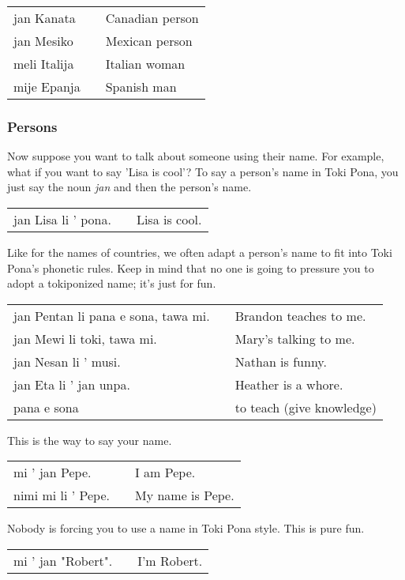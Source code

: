 \begin{supertabular}{p{5,5cm}|ll}
jan Kanata && Canadian person \\
jan Mesiko && Mexican person \\
meli Italija && Italian woman \\
mije Epanja && Spanish man \\
\end{supertabular} 

%
\subsubsection*{Persons}
%
Now suppose you want to talk about someone using their name. 
For example, what if you want to say 'Lisa is cool'? 
To say a person's name in Toki Pona, you just say the noun \textit{jan} and then the person's name. 

\begin{supertabular}{p{5,5cm}|ll}
jan Lisa li ' pona. && Lisa is cool. \\
\end{supertabular} 

Like for the names of countries, we often adapt a person's name to fit into Toki Pona's phonetic rules. 
Keep in mind that no one is going to pressure you to adopt a tokiponized name; it's just for fun. 

\begin{supertabular}{p{5,5cm}|ll}
jan Pentan li pana e sona, tawa mi. && Brandon teaches to me. \\
jan Mewi li toki, tawa mi. && Mary's talking to me. \\
jan Nesan li ' musi. && Nathan is funny. \\
jan Eta li ' jan unpa. && Heather is a whore. \\
pana e sona && to teach (give knowledge) \\
\end{supertabular} 

This is the way to say your name. 

\begin{supertabular}{p{5,5cm}|ll}
mi ' jan Pepe. && I am Pepe. \\
nimi mi li ' Pepe. && My name is Pepe. 
\end{supertabular} 

Nobody is forcing you to use a name in Toki Pona style.
This is pure fun.

\begin{supertabular}{p{5,5cm}|ll}
mi ' jan "Robert". && I'm Robert. \\
\end{supertabular} 

